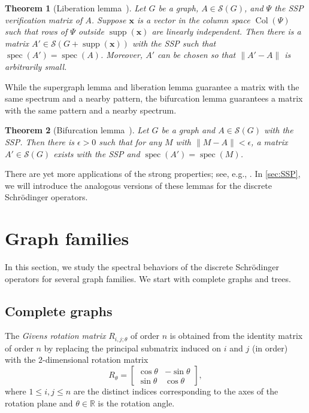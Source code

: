 \documentclass{article}
\newtheorem{theorem}{Theorem}[section]
\theoremstyle{definition}
\newcommand{\bx}{\mathbf{x}}
\newcommand{\Col}{\operatorname{Col}}
\newcommand{\spec}{\operatorname{spec}}
\newcommand{\mptn}{\mathcal{S}}
\newcommand{\vsupp}{\operatorname{supp}}
\begin{document}
\begin{theorem}[Liberation lemma~\cite{IEPG2}]
\label{thm:lib}
Let $G$ be a graph, $A\in\mptn(G)$, and $\Psi$ the SSP verification matrix of $A$.  Suppose $\bx$ is a vector in the column space $\Col(\Psi)$ such that rows of $\Psi$ outside $\vsupp(\bx)$ are linearly independent.  Then there is a matrix $A'\in\mptn(G + \vsupp(\bx))$ with the SSP such that $\spec(A') = \spec(A)$.  Moreover, $A'$ can be chosen so that $\|A' - A\|$ is arbitrarily small.
\end{theorem}

While the supergraph lemma and liberation lemma guarantee a matrix with the same spectrum and a nearby pattern, the bifurcation lemma guarantees a matrix with the same pattern and a nearby spectrum.  

\begin{theorem}[Bifurcation lemma~\cite{bifur}]
\label{thm:bif}
Let $G$ be a graph and $A\in\mptn(G)$ with the SSP.  Then there is $\epsilon > 0$ such that for any $M$ with $\|M - A\| < \epsilon$, a matrix $A'\in\mptn(G)$ exists with the SSP and $\spec(A') = \spec(M)$.
\end{theorem}

There are yet more applications of the strong properties; see, e.g., \cite{IEPGZF22}.  In \cref{sec:SSP}, we will introduce the analogous versions of these lemmas for the discrete Schrödinger operators.  

\section{Graph families}
\label{sec:families}

In this section, we study the spectral behaviors of the discrete Schrödinger operators for several graph families.  We start with complete graphs and trees.

\subsection{Complete graphs}

The \emph{Givens rotation matrix} $R_{i,j;\theta}$ of order $n$ is obtained from the identity matrix of order $n$ by replacing the principal submatrix induced on $i$ and $j$ (in order) with the $2$-dimensional rotation matrix
\begin{equation}
\label{eq:rtheta}
    R_\theta = \begin{bmatrix}
        \cos\theta & -\sin\theta \\
        \sin\theta & \cos\theta
    \end{bmatrix}, 
\end{equation}
where $1\leq i,j\leq n$ are the distinct indices corresponding to the axes of the rotation plane and $\theta\in\mathbb{R}$ is the rotation angle.
\end{document}

